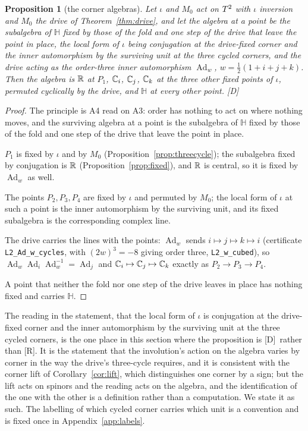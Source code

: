\documentclass[11pt,a4paper]{article}
\theoremstyle{plain}
\newtheorem{proposition}[theorem]{Proposition}
\theoremstyle{definition}
\theoremstyle{remark}
\newcommand{\Hquat}{\mathbb{H}}
\newcommand{\Ad}{\operatorname{Ad}}
\newcommand{\rigR}{[\textup{R}]}
\newcommand{\rigD}{[\textup{D}]}
\begin{document}
\begin{proposition}[the corner algebras]\label{prop:collapse}
Let $\iota$ and $M_{0}$ act on $T^2$ with $\iota$ inversion and $M_{0}$ the drive of Theorem~\ref{thm:drive}, and let the algebra at a point be the subalgebra of $\Hquat$ fixed by those of the fold and one step of the drive that leave the point in place, the local form of $\iota$ being conjugation at the drive-fixed corner and the inner automorphism by the surviving unit at the three cycled corners, and the drive acting as the order-three inner automorphism $\Ad_{w}$, $w=\tfrac12(1+i+j+k)$. Then the algebra is $\mathbb{R}$ at $P_{1}$, $\mathbb{C}_{i}$, $\mathbb{C}_{j}$, $\mathbb{C}_{k}$ at the three other fixed points of $\iota$, permuted cyclically by the drive, and $\Hquat$ at every other point. \rigD
\end{proposition}

\begin{proof}
The principle is A4 read on A3: order has nothing to act on where nothing moves, and the surviving algebra at a point is the subalgebra of $\Hquat$ fixed by those of the fold and one step of the drive that leave the point in place.

$P_{1}$ is fixed by $\iota$ and by $M_{0}$ (Proposition~\ref{prop:threecycle}); the subalgebra fixed by conjugation is $\mathbb{R}$ (Proposition~\ref{prop:fixed}), and $\mathbb{R}$ is central, so it is fixed by $\Ad_{w}$ as well.

The points $P_{2},P_{3},P_{4}$ are fixed by $\iota$ and permuted by $M_{0}$; the local form of $\iota$ at such a point is the inner automorphism by the surviving unit, and its fixed subalgebra is the corresponding complex line.

The drive carries the lines with the points: $\Ad_{w}$ sends $i\mapsto j\mapsto k\mapsto i$ (certificate \texttt{L2\_Ad\_w\_cycles}, with $(2w)^{3}=-8$ giving order three, \texttt{L2\_w\_cubed}), so $\Ad_{w}\Ad_{i}\Ad_{w}^{-1}=\Ad_{j}$ and $\mathbb{C}_{i}\mapsto\mathbb{C}_{j}\mapsto\mathbb{C}_{k}$ exactly as $P_{2}\to P_{3}\to P_{4}$.

A point that neither the fold nor one step of the drive leaves in place has nothing fixed and carries $\Hquat$.
\end{proof}

The reading in the statement, that the local form of $\iota$ is conjugation at the drive-fixed corner and the inner automorphism by the surviving unit at the three cycled corners, is the one place in this section where the proposition is \rigD\ rather than \rigR. It is the statement that the involution's action on the algebra varies by corner in the way the drive's three-cycle requires, and it is consistent with the corner lift of Corollary~\ref{cor:lift}, which distinguishes one corner by a sign; but the lift acts on spinors and the reading acts on the algebra, and the identification of the one with the other is a definition rather than a computation. We state it as such. The labelling of which cycled corner carries which unit is a convention and is fixed once in Appendix~\ref{app:labels}.
\end{document}

